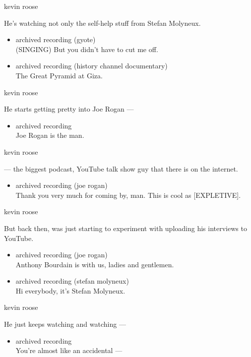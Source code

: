 kevin roose

He's watching not only the self-help stuff from Stefan Molyneux.

\begin{itemize}
\item
  archived recording (gyote)\\
  (SINGING) But you didn't have to cut me off.
\item
  archived recording (history channel documentary)\\
  The Great Pyramid at Giza.
\end{itemize}

kevin roose

He starts getting pretty into Joe Rogan ---

\begin{itemize}
\tightlist
\item
  archived recording\\
  Joe Rogan is the man.
\end{itemize}

kevin roose

--- the biggest podcast, YouTube talk show guy that there is on the
internet.

\begin{itemize}
\tightlist
\item
  archived recording (joe rogan)\\
  Thank you very much for coming by, man. This is cool as
  {[}EXPLETIVE{]}.
\end{itemize}

kevin roose

But back then, was just starting to experiment with uploading his
interviews to YouTube.

\begin{itemize}
\item
  archived recording (joe rogan)\\
  Anthony Bourdain is with us, ladies and gentlemen.
\item
  archived recording (stefan molyneux)\\
  Hi everybody, it's Stefan Molyneux.
\end{itemize}

kevin roose

He just keeps watching and watching ---

\begin{itemize}
\tightlist
\item
  archived recording\\
  You're almost like an accidental ---
\end{itemize}

